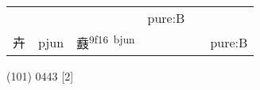 \documentclass[14pt,a4paper]{scrartcl}
\begin{document}
\begin{longtable}[c]{@{}llllll@{}}
\begin{minipage}[t]{0.14\columnwidth}
\strut\end{minipage} &
\begin{minipage}[t]{0.14\columnwidth}\raggedright\strut
\strut\end{minipage} &
\begin{minipage}[t]{0.14\columnwidth}\raggedright\strut
\strut\end{minipage} &
\begin{minipage}[t]{0.14\columnwidth}\raggedright\strut
pure:B
\strut\end{minipage}\tabularnewline
\begin{minipage}[t]{0.14\columnwidth}\raggedright\strut
卉
\strut\end{minipage} &
\begin{minipage}[t]{0.14\columnwidth}\raggedright\strut
pjun
\strut\end{minipage} &
\begin{minipage}[t]{0.14\columnwidth}\raggedright\strut
鼖\textsuperscript{9f16~bjun}
\strut\end{minipage} &
\begin{minipage}[t]{0.14\columnwidth}\raggedright\strut
\strut\end{minipage} &
\begin{minipage}[t]{0.14\columnwidth}\raggedright\strut
\strut\end{minipage} &
\begin{minipage}[t]{0.14\columnwidth}\raggedright\strut
pure:B
\strut\end{minipage}\tabularnewline
\bottomrule
\end{longtable}

(101) 0443 {[}2{]}
\end{document}
